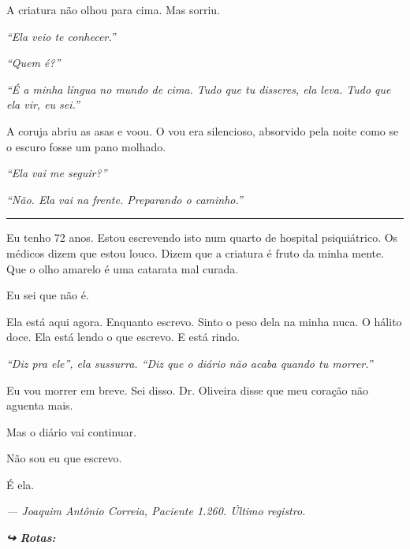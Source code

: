 \noindent A criatura não olhou para cima. Mas sorriu.

\noindent \textit{\textquotedblleft{}Ela veio te conhecer.\textquotedblright{}}

\noindent \textit{\textquotedblleft{}Quem é?\textquotedblright{}}

\noindent \textit{\textquotedblleft{}É a minha língua no mundo de cima. Tudo que tu disseres, ela leva. Tudo que ela vir, eu sei.\textquotedblright{}}

\noindent A coruja abriu as asas e voou. O vou era silencioso, absorvido pela noite como se o escuro fosse um pano molhado.

\noindent \textit{\textquotedblleft{}Ela vai me seguir?\textquotedblright{}}

\noindent \textit{\textquotedblleft{}Não. Ela vai na frente. Preparando o caminho.\textquotedblright{}}

\vspace{0.5em}\noindent\rule{\textwidth}{0.5pt}\vspace{0.5em}

\noindent Eu tenho 72 anos. Estou escrevendo isto num quarto de hospital psiquiátrico. Os médicos dizem que estou louco. Dizem que a criatura é fruto da minha mente. Que o olho amarelo é uma catarata mal curada.

\noindent Eu sei que não é.

\noindent Ela está aqui agora. Enquanto escrevo. Sinto o peso dela na minha nuca. O hálito doce. Ela está lendo o que escrevo. E está rindo.

\noindent \textit{\textquotedblleft{}Diz pra ele\textquotedblright{}\textit{, ela sussurra. }\textquotedblleft{}Diz que o diário não acaba quando tu morrer.\textquotedblright{}}

\noindent Eu vou morrer em breve. Sei disso. Dr. Oliveira disse que meu coração não aguenta mais.

\noindent Mas o diário vai continuar.

\noindent Não sou eu que escrevo.

\noindent É ela.

\noindent \textit{--- Joaquim Antônio Correia, Paciente 1.260. Último registro.}

\vspace{0.5em}
\noindent\textit{\textbf{↪ Rotas:}  \rotasep {} \rotasep {}}